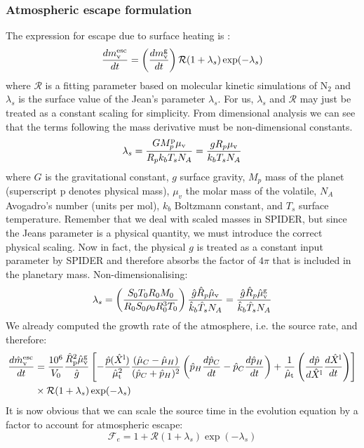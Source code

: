 \subsubsection{Atmospheric escape formulation}
The expression for escape due to surface heating is \citep{JOY15}: %
\begin{equation}
\frac{d m_{\rm v}^{\rm esc}}{dt} = \left( \frac{d m_{\rm v}^{\rm g}}{dt} \right) \mathcal{R} (1 + \lambda_s) \exp(-\lambda_s) 
\end{equation}
where $\mathcal{R}$ is a fitting parameter based on molecular kinetic simulations of N$_2$ \citep{VJT11,VTE11} and $\lambda_s$ is the surface value of the Jean's parameter $\lambda_s$.  For us, $\lambda_s$ and $\mathcal{R}$ may just be treated as a constant scaling for simplicity.  From dimensional analysis we can see that the terms following the mass derivative must be non-dimensional constants.
\begin{equation}
\lambda_s =  \frac{G M_p^{\rm p} \mu_{\rm v}}{R_p k_b T_s N_A} = \frac{g R_p \mu_{\rm v}}{k_b T_s N_A}
\end{equation}
where $G$ is the gravitational constant, $g$ surface gravity, $M_p$ mass of the planet (superscript p denotes physical mass), $\mu_v$ the molar mass of the volatile, $N_A$ Avogadro's number (units per mol), $k_b$ Boltzmann constant, and $T_s$ surface temperature.  Remember that we deal with scaled masses in SPIDER, but since the Jeans parameter is a physical quantity, we must introduce the correct physical scaling.  Now in fact, the physical $g$ is treated as a constant input parameter by SPIDER and therefore absorbs the factor of $4 \pi$ that is included in the planetary mass.  Non-dimensionalising:
\begin{equation}
\lambda_s = \left( \frac{S_0 T_0 R_0 M_0}{R_0 S_0 \rho_0 R_0^3 T_0} \right) \frac{\hat{g} \hat{R}_p \hat{\mu}_{\rm v}}{\hat{k}_b \hat{T}_s N_A} = \frac{\hat{g} \hat{R}_p \hat{\mu}_{\rm v}^{\rm g}}{\hat{k}_b \hat{T}_s N_A}
\end{equation}
We already computed the growth rate of the atmosphere, i.e. the source rate, and therefore:
\begin{align}
\frac{d \hat{m}_{\rm v}^{\rm esc}}{dt} &= \frac{10^6}{V_0} \frac{\hat{R}_{\rm p}^2 \hat{\mu}_{\rm v}^{\rm g}}{\hat{g}}
\left[
-\frac{\hat{p}(\hat{X}^{\rm l})}{\hat{\mu}_{\rm t}^2} \frac{(\hat{\mu}_C-\hat{\mu}_H)}{(\hat{p}_C+\hat{p}_H)^2} \left( \hat{p}_H \frac{d\hat{p}_C}{dt} - \hat{p}_C \frac{d\hat{p}_H}{dt} \right) + \frac{1}{\hat{\mu}_{\rm t}} \left( \frac{d \hat{p}}{d \hat{X}^{\rm l}} \frac{d \hat{X}^{\rm l}}{d t} \right)
\right]\\
& \times \mathcal{R} (1 + \lambda_s) \exp(-\lambda_s) 
\end{align}
It is now obvious that we can scale the source time in the evolution equation by a factor to account for atmospheric escape:
\begin{equation}
\mathcal{F}_e = 1+\mathcal{R} (1 + \lambda_s) \exp(-\lambda_s)
\end{equation}
